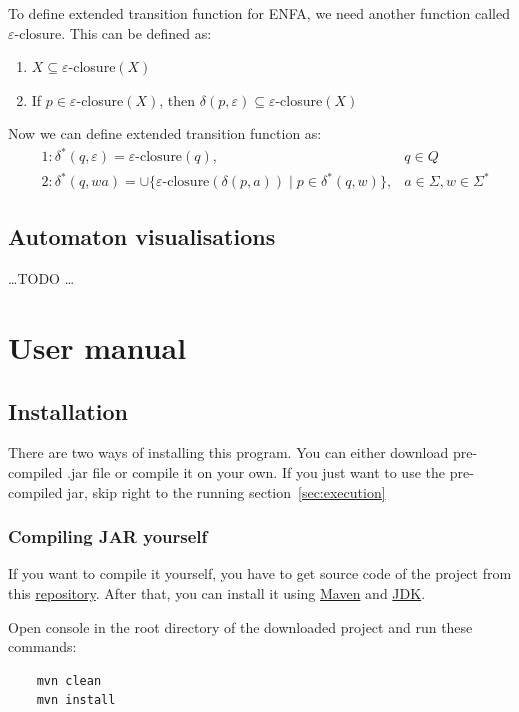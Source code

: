 \documentclass{ctuthesis}
\begin{document}
To define extended transition function for ENFA, we need another function called $\varepsilon$-closure. This can be defined as:
\begin{enumerate}
	\item $X \subseteq \varepsilon$-closure$(X)$
	\item If $p \in \varepsilon$-closure$(X)$, then $\delta(p, \varepsilon) \subseteq \varepsilon$-closure$(X)$
\end{enumerate}

Now we can define extended transition function as:
\begin{align*}
	&1: \delta^*(q, \varepsilon) = \varepsilon\text{-closure}(q), &q \in Q \\
	&2: \delta^*(q, wa) = \cup\{\varepsilon\text{-closure}(\delta(p, a)) \mid p \in \delta^*(q, w)\}, &a \in \Sigma, w \in \Sigma^*
\end{align*}

\section{Automaton visualisations}
\ldots TODO \ldots


\chapter{User manual}
\section{Installation}
There are two ways of installing this program. You can either download pre-compiled .jar file or compile it on your own. If you just want to use the pre-compiled jar, skip right to the running section~\ref{sec:execution}

\subsection{Compiling JAR yourself}
If you want to compile it yourself, you have to get source code of the project from this \href{https://github.com/horovtom/jautomata}{repository}. After that, you can install it using \href{https://maven.apache.org/}{Maven} and \href{https://www.oracle.com/technetwork/java/javase/downloads/jdk8-downloads-2133151.html}{JDK}. %

Open console in the root directory of the downloaded project and run these commands:
\begin{verbatim}
	mvn clean
	mvn install
\end{verbatim}
\end{document}
